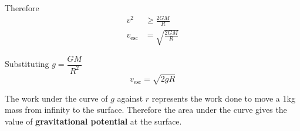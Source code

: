 Therefore
\begin{align*}
    v^2&\geq\frac{2GM}{R}\\
    v_\text{esc}&=\sqrt{\frac{2GM}{R}}
\end{align*}

Substituting $g=\dfrac{GM}{R^2}$
$$v_\text{esc}=\sqrt{2gR}$$

The work under the curve of $g$ against $r$ represents the work done to move a 1kg mass from infinity to the surface. Therefore the area under the curve gives the value of \textbf{gravitational potential} at the surface.
